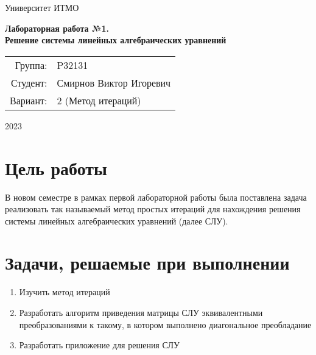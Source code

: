 \documentclass{article}
\begin{document}
\begin{titlepage}
    \begin{center}
        \begin{spacing}{1.4}
            \large{Университет ИТМО} \\
        \end{spacing}
        \vfill
        \textbf{
            \huge{Лабораторная работа №1.} \\
            \huge{Решение системы линейных алгебраических уравнений}
        }
    \end{center}
    \vfill
    \begin{center}
        \begin{tabular}{r l}
            Группа:  & P32131                  \\
            Студент: & Смирнов Виктор Игоревич \\
            Вариант: & 2 (Метод итераций)      \\
        \end{tabular}
    \end{center}
    \vfill
    \begin{center}
        \begin{large}
            2023
        \end{large}
    \end{center}
\end{titlepage}

\section{Цель работы}
В новом семестре в рамках первой лабораторной работы
была поставлена задача реализовать так называемый метод
простых итераций для нахождения решения системы
линейных алгебраических уравнений (далее СЛУ).

\section{Задачи, решаемые при выполнении}
\begin{enumerate}
    \item Изучить метод итераций
    \item Разработать алгоритм приведения матрицы СЛУ
          эквивалентными преобразованиями к такому,
          в котором выполнено диагональное преобладание
    \item Разработать приложение для решения СЛУ
\end{enumerate}
\end{document}

